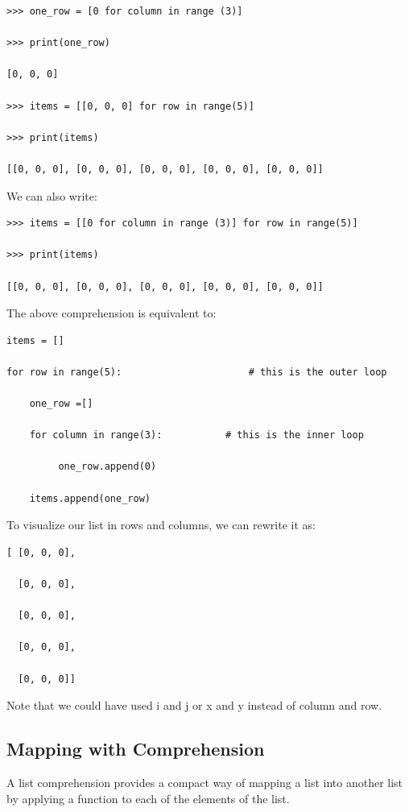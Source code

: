 \documentclass{article}
\begin{document}
\begin{lstlisting}
>>> one_row = [0 for column in range (3)] 

>>> print(one_row)

[0, 0, 0]

>>> items = [[0, 0, 0] for row in range(5)]

>>> print(items)

[[0, 0, 0], [0, 0, 0], [0, 0, 0], [0, 0, 0], [0, 0, 0]]
\end{lstlisting}

We can also write:

\begin{lstlisting}
>>> items = [[0 for column in range (3)] for row in range(5)]

>>> print(items)

[[0, 0, 0], [0, 0, 0], [0, 0, 0], [0, 0, 0], [0, 0, 0]]
\end{lstlisting}

The above comprehension is equivalent to:

\begin{lstlisting}
items = []

for row in range(5):                      # this is the outer loop

    one_row =[]

    for column in range(3):           # this is the inner loop    

         one_row.append(0)

    items.append(one_row)
\end{lstlisting}

To visualize our list in rows and columns, we can rewrite it as:

\begin{lstlisting}
[ [0, 0, 0], 

  [0, 0, 0], 

  [0, 0, 0], 

  [0, 0, 0], 

  [0, 0, 0]]
\end{lstlisting}

Note that we could have used i and j or x and y instead of column and row.

\subsection{Mapping with Comprehension}
A list comprehension provides a compact way of mapping a list into another list by applying a function to each of the elements of the list.
\end{document}
